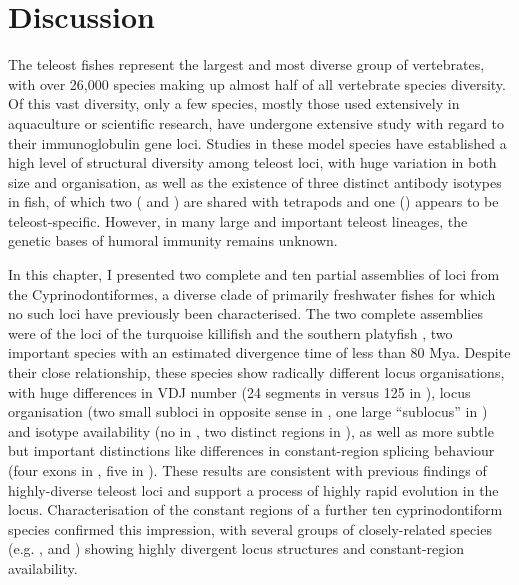 \newpage
\section{Discussion} %

The teleost fishes represent the largest and most diverse group of vertebrates, with over 26,000 species making up almost half of all vertebrate species diversity. Of this vast diversity, only a few species, mostly those used extensively in aquaculture or scientific research, have undergone extensive study with regard to their immunoglobulin gene loci. Studies in these model species have established a high level of structural diversity among teleost \igh{} loci, with huge variation in both size and organisation, as well as the existence of three distinct antibody isotypes in fish, of which two ( and ) are shared with tetrapods and one () appears to be teleost-specific. However, in many large and important teleost lineages, the genetic bases of humoral immunity remains unknown.

In this chapter, I presented two complete and ten partial assemblies of \igh{} loci from the Cyprinodontiformes, a diverse clade of primarily freshwater fishes for which no such loci have previously been characterised. The two complete assemblies were of the \igh{} loci of the turquoise killifish \nfu and the southern platyfish \xma, two important species with an estimated divergence time of less than 80 Mya. Despite their close relationship, these species show radically different locus organisations, with huge differences in VDJ number (24 \vh segments in \Nfu versus 125 in \Xma), locus organisation (two small subloci in opposite sense in \Nfu, one large ``sublocus'' in \Xma) and isotype availability (no  in \Nfu, two distinct  regions in \Xma), as well as more subtle but important distinctions like differences in constant-region splicing behaviour (four exons in \Nfu {}, five in \Xma). These results are consistent with previous findings of highly-diverse teleost loci and support a process of highly rapid evolution in the \igh{} locus. Characterisation of the constant regions of a further ten cyprinodontiform species confirmed this impression, with several groups of closely-related species (e.g. \nfu,  and ) showing highly divergent locus structures and constant-region availability.

